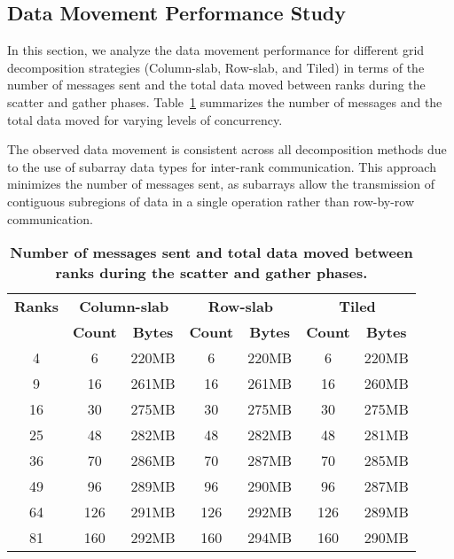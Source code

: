 \subsection{Data Movement Performance Study}
\label{subsec:data-movement-performance-study}

In this section, we analyze the data movement performance for different grid decomposition strategies (Column-slab, Row-slab, and Tiled) in terms of the number of messages sent and the total data moved between ranks during the scatter and gather phases. Table~\ref{tab:data-movement} summarizes the number of messages and the total data moved for varying levels of concurrency.

The observed data movement is consistent across all decomposition methods due to the use of subarray data types for inter-rank communication. This approach minimizes the number of messages sent, as subarrays allow the transmission of contiguous subregions of data in a single operation rather than row-by-row communication.

\begin{table}[htbp]
    \centering
    \begin{tabular}{c|c|c|c|c|c|c} 
        \textbf{Ranks} & \multicolumn{2}{c|}{\textbf{Column-slab}} & \multicolumn{2}{c|}{\textbf{Row-slab}} & \multicolumn{2}{c}{\textbf{Tiled}} \\ 
         & \textbf{Count} & \textbf{Bytes} & \textbf{Count} & \textbf{Bytes} & \textbf{Count} & \textbf{Bytes} \\ 
        \hline
        4  & 6   & 220MB & 6   & 220MB & 6   & 220MB \\ 
        9  & 16  & 261MB & 16  & 261MB & 16  & 260MB \\ 
        16 & 30  & 275MB & 30  & 275MB & 30  & 275MB \\
        25 & 48  & 282MB & 48  & 282MB & 48  & 281MB \\
        36 & 70  & 286MB & 70  & 287MB & 70  & 285MB \\
        49 & 96  & 289MB & 96  & 290MB & 96  & 287MB \\
        64 & 126 & 291MB & 126 & 292MB & 126 & 289MB \\
        81 & 160 & 292MB & 160 & 294MB & 160 & 290MB \\ 
    \end{tabular}
    \caption{\textbf{Number of messages sent and total data moved between ranks during the scatter and gather phases.}}
    \label{tab:data-movement}
\end{table}